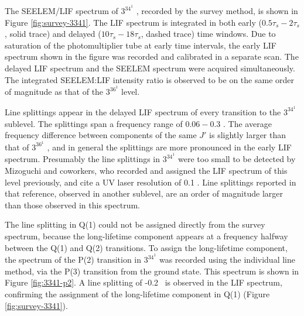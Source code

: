 
The SEELEM/LIF spectrum of $3^34^1$ , recorded by the survey
method, is shown in Figure \ref{fig:survey-3341}.  The LIF spectrum is
integrated in both early ($0.5\tau_s-2\tau_s$, solid trace) and
delayed ($10\tau_s-18\tau_s$, dashed trace) time windows.  Due to
saturation of the photomultiplier tube at early time intervals, the
early LIF spectrum shown in the figure was recorded and calibrated in
a separate scan.  The delayed LIF spectrum and the SEELEM spectrum
were acquired simultaneously.  The integrated SEELEM:LIF intensity
ratio is observed to be on the same order of magnitude as that of the
$3^36^1$  level.

Line splittings appear in the delayed LIF spectrum of every transition
to the $3^34^1$  sublevel.  The splittings span a frequency
range of $0.06-0.3$ \rcm.  The average frequency difference between
components of the same $J'$ is slightly larger than that of
$3^36^1$ , and in general the splittings are more pronounced in the early
LIF spectrum.  Presumably the line splittings in $3^34^1$  were
too small to be detected by Mizoguchi and coworkers, who recorded and
assigned the LIF spectrum of this level previously, and cite a UV
laser resolution of 0.1 \rcm \cite{mizoguchi00}.  Line splittings
reported in that reference, observed in another sublevel, are an order
of magnitude larger than those observed in this spectrum.

The line splitting in Q(1) could not be assigned directly from the
survey spectrum, because the long-lifetime component appears at a
frequency halfway between the Q(1) and Q(2) transitions.  To assign
the long-lifetime component, the spectrum of the P(2) transition in
$3^34^1$  was recorded using the individual line method, via the
P(3) transition from the ground state.  This spectrum is shown in
Figure \ref{fig:3341-p2}.  A line splitting of -0.2 \rcm\ is observed
in the LIF spectrum, confirming the assignment of the long-lifetime
component in Q(1) (Figure \ref{fig:survey-3341}).


